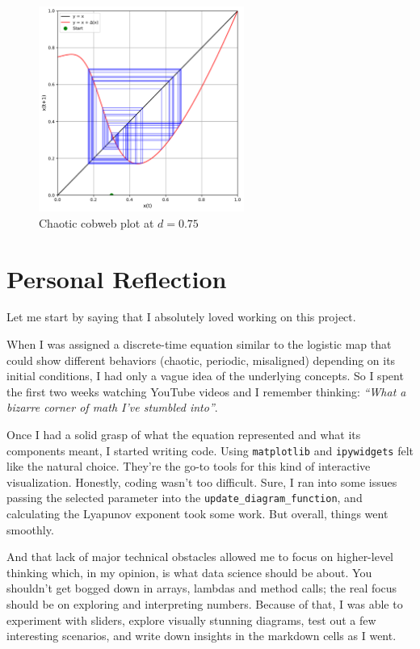 \documentclass[a4paper, 10pt]{article}
\begin{document}
\begin{figure}[h]
    \centering
    \includegraphics[width=0.6\textwidth]{../images/int-cases/chaotic-cobweb.pdf}
    \caption{Chaotic cobweb plot at $d=0.75$}
    \label{fig:chaotic-cobweb}
\end{figure}

\clearpage

\section{Personal Reflection}
Let me start by saying that I absolutely loved working on this project.

When I was assigned a discrete-time equation similar to the logistic map that could show different behaviors (chaotic, periodic, misaligned) depending on its initial conditions, I had only a vague idea of the underlying concepts. 
So I spent the first two weeks watching YouTube videos and I remember thinking: \textit{“What a bizarre corner of math I’ve stumbled into”}.

Once I had a solid grasp of what the equation represented and what its components meant, I started writing code. 
Using \texttt{matplotlib} and \texttt{ipywidgets} felt like the natural choice. They’re the go-to tools for this kind of interactive visualization. 
Honestly, coding wasn’t too difficult. Sure, I ran into some issues passing the selected parameter into the \texttt{update\_diagram\_function}, and calculating the Lyapunov exponent took some work.
But overall, things went smoothly. 

And that lack of major technical obstacles allowed me to focus on higher-level thinking which, in my opinion, is what data science should be about. 
You shouldn’t get bogged down in arrays, lambdas and method calls; the real focus should be on exploring and interpreting numbers. 
Because of that, I was able to experiment with sliders, explore visually stunning diagrams, test out a few interesting scenarios, and write down insights in the markdown cells as I went.
\end{document}
